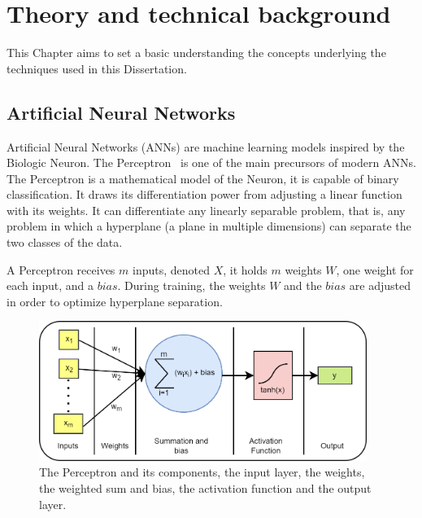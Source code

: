 \newpage

\chapter{Theory and technical background}
\label{chap:theory}

This Chapter aims to set a basic understanding the concepts underlying the techniques used in this Dissertation.

\section{Artificial Neural Networks}\label{sec:NNs}

Artificial Neural Networks (ANNs) are machine learning models inspired by the Biologic Neuron. The Perceptron~\cite{rosenbaltt1957perceptron} is one of the main precursors of modern ANNs. The Perceptron is a mathematical model of the Neuron, it is capable of binary classification. It draws its differentiation power from adjusting a linear function with its weights. It can differentiate any linearly separable problem, that is, any problem in which a hyperplane (a plane in multiple dimensions) can separate the two classes of the data.

A Perceptron receives $m$ inputs, denoted $X$, it holds $m$ weights $W$, one weight for each input, and a $bias$. During training, the weights $W$ and the $bias$ are adjusted in order to optimize hyperplane separation.

\begin{figure}[!ht]
    \centering
    \includegraphics[width=0.95\textwidth]{img/Perceptron.drawio.png}
    \caption{The Perceptron and its components, the input layer, the weights, the weighted sum and bias, the activation function and the output layer.}
    \label{fig:perceptron}
\end{figure}

